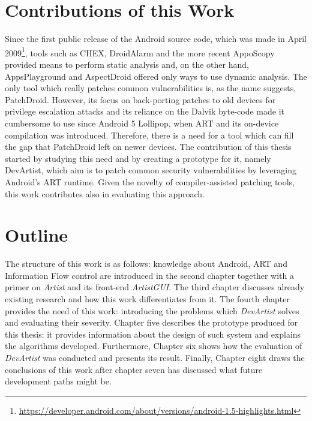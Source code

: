 \section{Contributions of this Work} 
Since the first public release of the Android source code, which was made in April 2009\footnote{\url{https://developer.android.com/about/versions/android-1.5-highlights.html}}, tools such as CHEX\cite{chex}, DroidAlarm\cite{droidalarm} and the more recent AppoScopy\cite{apposcopy} provided means to perform static analysis and, on the other hand, AppsPlayground\cite{appsplayground} and AspectDroid\cite{AspectDroid} offered only ways to use dynamic analysis. The only tool which really patches common vulnerabilities is, as the name suggests, PatchDroid\cite{patchdroid}. However, its focus on back-porting patches to old devices for privilege escalation attacks and its reliance on the Dalvik byte-code made it cumbersome to use since Android 5 Lollipop, when ART and its on-device compilation was introduced. Therefore, there is a need for a tool which can fill the gap that PatchDroid left on newer devices. The contribution of this thesis started by studying this need and by creating a prototype for it, namely DevArtist, which aim is to patch common security vulnerabilities by leveraging Android's ART runtime. Given the novelty of compiler-assisted patching tools, this work contributes also in evaluating this approach.

\section{Outline}
The structure of this work is as follows: knowledge about Android, ART and Information Flow control are introduced in the second chapter together with a primer on \emph{Artist} and its front-end \emph{ArtistGUI}. The third chapter discusses already existing research and how this work differentiates from it. The fourth chapter provides the need of this work: introducing the problems which \emph{DevArtist} solves and evaluating their severity. Chapter five describes the prototype produced for this thesis: it provides information about the design of such system and explains the algorithms developed. Furthermore, Chapter six shows how the evaluation of \emph{DevArtist} was conducted and presents its result. 
Finally, Chapter eight draws the conclusions of this work after chapter seven has discussed what future development paths might be.

